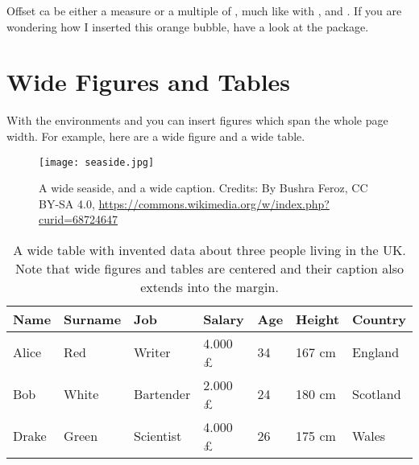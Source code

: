 Offset ca be either a measure or a multiple of ,
much like with ,  and
. If you are wondering how I
inserted this orange bubble, have a look at the  package.


\section{Wide Figures and Tables}


With the environments  and  you
can insert figures which span the whole page width. For example, here
are a wide figure and a wide table.


\begin{figure*}[h!]
	\texttt{[image: seaside.jpg]}
	\caption[A wide seaside]{A wide seaside, and a wide caption.
		Credits: By Bushra Feroz, CC BY-SA 4.0, \url{https://commons.wikimedia.org/w/index.php?curid=68724647}}
\end{figure*}


\begin{table*}[h!]
    \caption{A wide table with invented data about three people living in the UK. Note that wide figures and tables are centered and their caption also extends into the margin.}
    \begin{tabular}{p{2.0cm} p{2.0cm} p{2.0cm} p{2.0cm} p{2.0cm} p{2.0cm} p{1.5cm}}
        \toprule
        Name    & Surname   & Job       & Salary           & Age   & Height    & Country \\
        \midrule
        Alice   & Red       & Writer    & 4.000 \pounds    & 34    & 167 cm     & England \\
        Bob     & White     & Bartender & 2.000 \pounds    & 24    & 180 cm     & Scotland \\
        Drake   & Green     & Scientist & 4.000 \pounds    & 26    & 175 cm     & Wales \\
        \bottomrule
    \end{tabular}
\end{table*}

\blindtext

